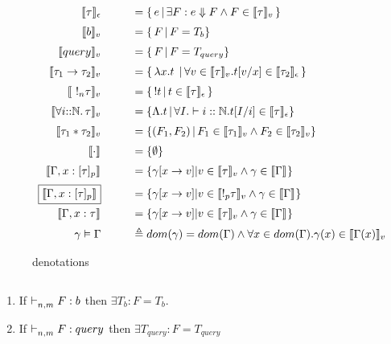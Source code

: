\documentclass{article}
\begin{document}
\begin{figure*}
$$
\begin{array}{rcl}
      \llbracket {\tau} \rrbracket_{\epsilon}  &\quad &  = \{ \, e \, | \, \exists F: e \Downarrow F \land F \in   \llbracket {\tau} \rrbracket_{v} \,  \}  \\[2mm]
      \llbracket {b} \rrbracket_{v} &\quad &  = \{ \,  F  \, | \, F = T_b \}  \\[2mm]
      \llbracket {query} \rrbracket_{v} &\quad &  = \{ \,  F \, |  \, F = T_{query} \}  \\[2mm]
      \llbracket {\tau_1 \rightarrow \tau_2} \rrbracket_{v} & \quad & = \{\, \mathrel { \lambda {x} . {t} } \, | \, \forall v \in\llbracket {\tau} \rrbracket_{v}. t[v/x] \in \llbracket {\tau_2} \rrbracket_{\epsilon} \, \} \\[2mm]
      \llbracket { \ !_n \tau} \rrbracket_{v} & \quad & = \{\, !t \, | \, t \in \llbracket {\tau} \rrbracket_{\epsilon} \, \} \\[2mm]
      \llbracket {\forall i{::}\mathbb{N}.\,{\tau}} \rrbracket_{v}  & \quad & = \{  \Lambda. t \, | \, \forall I. \vdash i :: \mathbb{N}. t[I/i] \in \llbracket {\tau} \rrbracket_{\epsilon}   \}  \\[2mm]
      \llbracket {\tau_1 * \tau_2} \rrbracket_{v}  & \quad & = \{  (F_1, F_2) \, | \, F_1 \in \llbracket {\tau_1} \rrbracket_{v} \land F_2 \in \llbracket {\tau_2} \rrbracket_{v}     \} \\[2mm]
      \llbracket {\cdot} \rrbracket_{} &\quad & = \{ \emptyset \} \\[2mm]
      \llbracket {\Gamma, x : [\tau]_p} \rrbracket_{} & \quad & = \{ \gamma[x \rightarrow v] | v \in \llbracket {\tau} \rrbracket_{v} \land \gamma \in \llbracket {\Gamma} \rrbracket_{}   \}  \\ [2mm]
      \boxed{\llbracket {\Gamma, x : [\tau]_p} \rrbracket_{}}  & \quad & = \{ \gamma[x \rightarrow v] | v \in \llbracket {!_p \tau} \rrbracket_{v}  \land \gamma \in \llbracket {\Gamma} \rrbracket_{}   \}  \\ [2mm]
      \llbracket {\Gamma, x : \tau} \rrbracket_{} & \quad & = \{ \gamma[x \rightarrow v] | v \in \llbracket {\tau} \rrbracket_{v} \land \gamma \in \llbracket {\Gamma} \rrbracket_{}   \}  \\ [2mm]
      \gamma \vDash \Gamma &\quad & \triangleq dom(\gamma) = dom(\Gamma) \land \forall x \in dom(\Gamma). \gamma(x) \in \llbracket {\Gamma(x)} \rrbracket_{v}
\end{array}
$$
\caption{denotations}
\end{figure*}

\clearpage


\begin{lemma} $ $
	\label{lem:1}
    \begin{enumerate}
\item If $\mathrel{\vdash_{n,m}^{} {F} : {b}} $ then $ \exists T_{b} : F = T_{b}$.\\
\item If $\mathrel{\vdash_{n,m}^{} {F} : {query}} $ then $ \exists T_{query} : F = T_{query}$
\end{enumerate}
	
	
\end{lemma}
\end{document}
